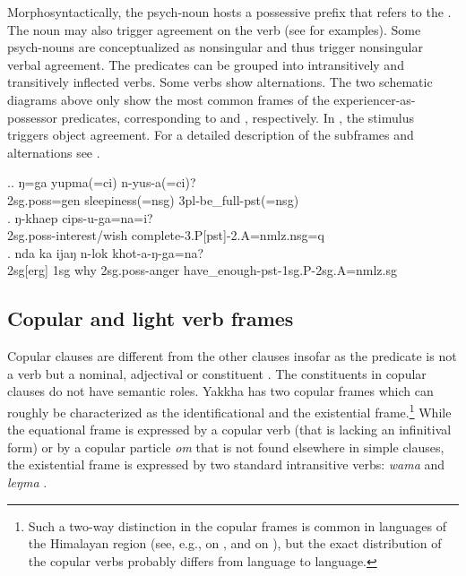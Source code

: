 Morphosyntactically, the psych-noun hosts a possessive prefix that refers to the . The noun may also trigger agreement on the verb (see \Next for examples). Some psych-nouns are conceptualized as nonsingular and thus trigger nonsingular verbal agreement. The predicates can be grouped into intransitively and transitively inflected verbs. Some verbs show alternations. The two schematic diagrams above only show the most common frames  of the experiencer-as-possessor predicates, corresponding to \Next[a] and \Next[b], respectively. In \Next[c], the stimulus triggers object agreement. For a  detailed description of the subframes and alternations see .

\ex.\ag. ŋ=ga yupma(=ci) n-yus-a(=ci)?\\	
		{\sc 2sg.poss=gen} sleepiness{\sc (=nsg)} 	{\sc 3pl}-be\_full{\sc -pst(=nsg)}\\
		\bg. ŋ-khaep cips-u-ga=na=i?\\
	{\sc 2sg.poss-}interest/wish complete{\sc -3.P[pst]-2.A=nmlz.nsg=q}\\
	\bg. nda ka ijaŋ n-lok khot-a-ŋ-ga=na?\\
	{\sc 2sg[erg]} {\sc 1sg} why {\sc 2sg.poss}-anger have\_enough{\sc -pst-1sg.P-2sg.A=nmlz.sg}\\


\subsection{Copular and light verb frames}\label{cop}

Copular clauses are different from the other clauses insofar as the predicate is not a verb but a nominal, adjectival or  constituent \citep[225]{Dryer2007Clause}. The constituents in copular clauses do not have semantic roles. Yakkha has two copular frames which can roughly be characterized as the identificational and the existential frame.\footnote{Such a two-way distinction in the copular frames is common in languages of the Himalayan region (see, e.g., \citealt{Genetti2007_Newari} on , and \citealt{Matthews1984Course} on ), but the exact distribution of the copular verbs probably differs from language to language.} While the equational frame is expressed by a copular verb (that is lacking an infinitival form) or by a copular particle \emph{om} that is not found elsewhere in simple clauses, the existential frame is expressed by two standard intransitive verbs: \emph{wama}  and \emph{leŋma} . 

